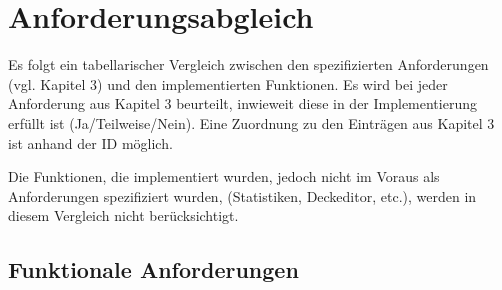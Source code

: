 \chapter{Anforderungsabgleich}
\label{cha:anforderungsabgleich}

Es folgt ein tabellarischer Vergleich zwischen den spezifizierten Anforderungen (vgl. Kapitel 3) und den implementierten Funktionen. Es wird bei jeder Anforderung aus Kapitel 3 beurteilt, inwieweit diese in der Implementierung erfüllt ist (Ja/Teilweise/Nein). Eine Zuordnung zu den Einträgen aus Kapitel 3 ist anhand der ID möglich.

Die Funktionen, die implementiert wurden, jedoch nicht im Voraus als Anforderungen spezifiziert wurden,  (Statistiken, Deckeditor, etc.), werden in diesem Vergleich nicht berücksichtigt.

\clearpage

\section{Funktionale Anforderungen}
\label{sec:anforderungsabgleich:funktional}

\setlength{\tabcolsep}{10pt}
\renewcommand{\arraystretch}{1.3}

